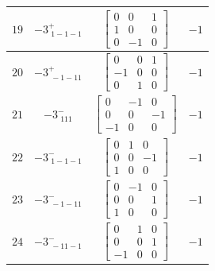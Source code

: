 \documentclass[fleqn,8pt]{jsarticle}
\begin{document}
\begin{longtable}{cccc}
$ 19 $ & $ -3^{+}_{\,\,1-1-1} $ & $ \begin{bmatrix} 0 & 0 & 1 \\ 1 & 0 & 0 \\ 0 & -1 & 0 \end{bmatrix} $ & $ -1 $ \\ \hline
$ 20 $ & $ -3^{+}_{\,\,-1-11} $ & $ \begin{bmatrix} 0 & 0 & 1 \\ -1 & 0 & 0 \\ 0 & 1 & 0 \end{bmatrix} $ & $ -1 $ \\ \hline
$ 21 $ & $ -3^{-}_{\,\,111} $ & $ \begin{bmatrix} 0 & -1 & 0 \\ 0 & 0 & -1 \\ -1 & 0 & 0 \end{bmatrix} $ & $ -1 $ \\ \hline
$ 22 $ & $ -3^{-}_{\,\,1-1-1} $ & $ \begin{bmatrix} 0 & 1 & 0 \\ 0 & 0 & -1 \\ 1 & 0 & 0 \end{bmatrix} $ & $ -1 $ \\ \hline
$ 23 $ & $ -3^{-}_{\,\,-1-11} $ & $ \begin{bmatrix} 0 & -1 & 0 \\ 0 & 0 & 1 \\ 1 & 0 & 0 \end{bmatrix} $ & $ -1 $ \\ \hline
$ 24 $ & $ -3^{-}_{\,\,-11-1} $ & $ \begin{bmatrix} 0 & 1 & 0 \\ 0 & 0 & 1 \\ -1 & 0 & 0 \end{bmatrix} $ & $ -1 $ \\
\end{longtable}
\end{document}
